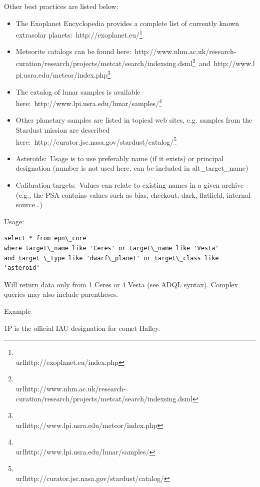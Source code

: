 \documentclass[11pt,a4paper]{ivoa}
\begin{document}
Other best practices are listed below:

\begin{itemize}
\item The Exoplanet Encyclopedia provides a complete list of currently known extrasolar planets: http://exoplanet.eu/\footnote{\\url{http://exoplanet.eu/index.php}}
\item Meteorite catalogs can be found here: http://www.nhm.ac.uk/research-curation/research/projects/metcat/search/indexsing.dsml\footnote{\\url{http://www.nhm.ac.uk/research-curation/research/projects/metcat/search/indexsing.dsml}} and http://www.lpi.usra.edu/meteor/index.php\footnote{\\url{http://www.lpi.usra.edu/meteor/index.php}}
\item The catalog of lunar samples is available here: http://www.lpi.usra.edu/lunar/samples/\footnote{\\url{http://www.lpi.usra.edu/lunar/samples/}}
\item Other planetary samples are listed in topical web sites, e.g. samples from the Stardust mission are described here: http://curator.jsc.nasa.gov/stardust/catalog/\footnote{\\url{http://curator.jsc.nasa.gov/stardust/catalog/}}
\item Asteroids: Usage is to use preferably name (if it exists) or principal designation (number is not used here, can be included in alt\_target\_name)
\item Calibration targets: Values can relate to existing names in a given archive (e.g., the PSA contains values such as bias, checkout, dark, flatfield, internal source…)
\end{itemize}

Usage:






\begin{verbatim}select * from epn\_core 
where target\_name like 'Ceres' or target\_name like 'Vesta' 
and target \_type like 'dwarf\_planet' or target\_class like 'asteroid'\end{verbatim}




Will return data only from 1 Ceres or 4 Vesta (see ADQL syntax). Complex queries may also include parentheses.

Example

1P is the official IAU designation for comet Halley.
\end{document}
